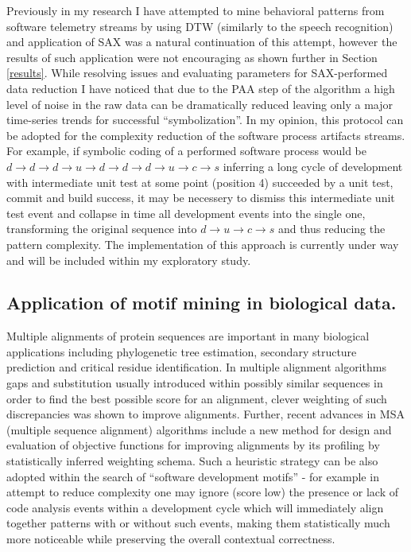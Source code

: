 \documentclass{sig-alternate}
\begin{document}
Previously in my research I have attempted to mine behavioral patterns from software telemetry streams by using DTW (similarly to the speech recognition) and application of SAX was a natural continuation of this attempt, however the results of such application were not encouraging as shown further in Section \ref{results}. While resolving issues and evaluating parameters for SAX-performed data reduction I have noticed that due to the PAA step of the algorithm a high level of noise in the raw data can be dramatically reduced  leaving only a major time-series trends for successful ``symbolization''. In my opinion, this protocol can be adopted for the complexity reduction of the software process artifacts streams. For example, if symbolic coding of a performed software process would be $d \rightarrow d \rightarrow d \rightarrow u \rightarrow d \rightarrow d \rightarrow d \rightarrow u \rightarrow c \rightarrow s $ inferring a long cycle of development with intermediate unit test at some point (position 4) succeeded by a unit test, commit and build success, it may be necessery to dismiss this intermediate unit test event and collapse in time all development events into the single one, transforming the original sequence into $d \rightarrow u \rightarrow c \rightarrow s $ and thus reducing the pattern complexity. The implementation of this approach is currently under way and will be included within my exploratory study.

\subsection{Application of motif mining in biological data.}
Multiple alignments of protein sequences are important in many biological applications including phylogenetic tree estimation, secondary structure prediction and critical residue identification. In multiple alignment algorithms gaps and substitution usually introduced within possibly similar sequences in order to find the best possible score for an alignment, clever weighting of such discrepancies was shown to improve alignments. Further, recent advances in MSA (multiple sequence alignment) algorithms \cite{citeulike:692} include a new method for design and evaluation of objective functions for improving alignments by its profiling by statistically inferred weighting schema. Such a heuristic strategy can be also adopted within the search of ``software development motifs'' - for example in attempt to reduce complexity one may ignore (score low) the presence or lack of code analysis events within a development cycle which will immediately align together patterns with or without such events, making them statistically much more noticeable while preserving the overall contextual correctness.
\end{document}
